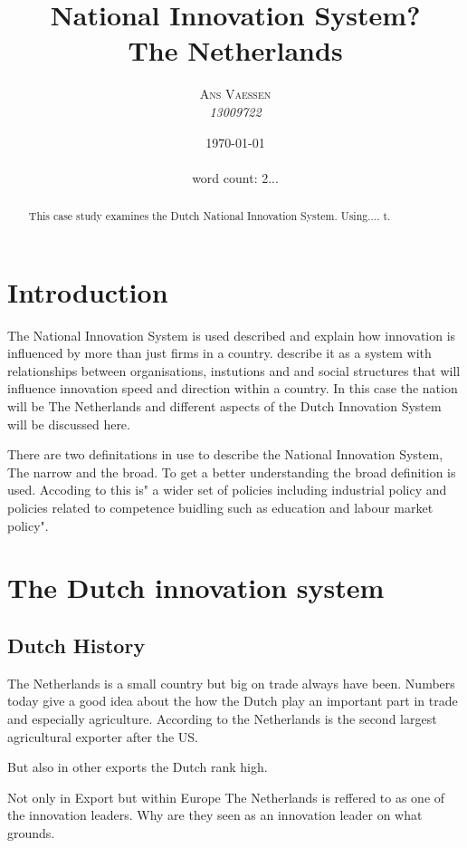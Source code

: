 \documentclass[a4paper, 11pt]{article}
\title{\textbf{National Innovation System?}\\The Netherlands}
\author{\textsc{Ans Vaessen}
\\{\textit{13009722}}}
\date{\today\\ \ \\
word count: 2...}
\begin{document}
\maketitle

\begin{abstract}
This case study examines the Dutch National Innovation System. Using.... t. 
\end{abstract}

\vspace{30pt} %

\section*{Introduction}
The National Innovation System is used described and explain how innovation is influenced by more than just firms in a country. \cite{chaminade2018} describe it as a system with relationships between organisations, instutions and and social structures that will influence innovation speed and direction within a country. In this case the nation will be The Netherlands and different aspects of the Dutch Innovation System will be discussed here. 

There are two definitations in use to describe the National Innovation System, The narrow and the broad. To get a better understanding the broad definition is used. Accoding to \citep[p. 9]{chaminade2018} this is" a wider set of policies including industrial policy and policies related to competence buidling such as education and labour market policy". 



\section{The Dutch innovation system}
\subsection{Dutch History}

The Netherlands is a small country but big on trade always have been. Numbers today give a good idea about the how the Dutch play an important part in trade and especially agriculture. According to \cite{holland2018} the Netherlands is the second largest agricultural exporter after the US. 

But also in other exports the Dutch rank high. 


Not only in Export but within Europe The Netherlands is reffered to as one of the innovation leaders. Why are they seen as an innovation leader on what grounds.
\end{document}

